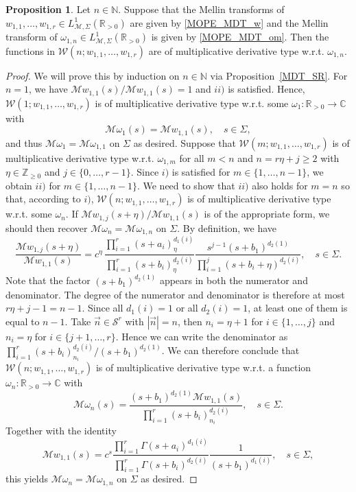 \documentclass[a4paper,12pt,oneside]{article}
\theoremstyle{definition}
\newtheorem{prop}[defi]{Proposition}
\newcommand{\N}{\mathbb{N}}
\newcommand{\Z}{\mathbb{Z}}
\newcommand{\C}{\mathbb{C}}
\newcommand{\R}{\mathbb{R}}
\newcommand{\om}{\omega}
\newcommand{\sz}[1]{\left| \vec{#1} \right|}
\newcommand{\MT}[1]{\mathcal{M}#1}
\begin{document}
\begin{prop}
Let $n\in\N$. Suppose that the Mellin transforms of $w_{1,1},\dots,w_{1,r}\in L^{1}_{\MT{},\Sigma}(\R_{>0})$ are given by \eqref{MOPE_MDT_w} and the Mellin transform of $\om_{1,n}\in L^{1}_{\MT{},\Sigma}(\R_{>0})$ is given by \eqref{MOPE_MDT_om}. Then the functions in $\mathcal{W}(n;w_{1,1},\dots,w_{1,r})$ are of multiplicative derivative type w.r.t. $\om_{1,n}$.
\end{prop}
\begin{proof}
    We will prove this by induction on $n\in\N$ via Proposition~\ref{MDT_SR}. For $n=1$, we have $\MT{w_{1,1}}(s)/\MT{w_{1,1}}(s)=1$ and $ii)$ is satisfied. Hence, $\mathcal{W}(1;w_{1,1},\dots,w_{1,r})$ is of multiplicative derivative type w.r.t. some $\om_1:\R_{>0}\to\C$ with
        $$ \MT{\om_1}(s)=\MT{w_{1,1}}(s),\quad s\in\Sigma, $$
    and thus $\MT{\om_1}=\MT{\om_{1,1}}$ on $\Sigma$ as desired. Suppose that $\mathcal{W}(m;w_{1,1},\dots,w_{1,r})$ is of multiplicative derivative type w.r.t. $\om_{1,m}$ for all $m<n$ and $n=r\eta+j\geq 2$ with $\eta\in\Z_{\geq 0}$ and $j\in\{0,\dots,r-1\}$. Since $i)$ is satisfied for $m\in\{1,\dots,n-1\}$, we obtain $ii)$ for $m\in\{1,\dots,n-1\}$. We need to show that $ii)$ also holds for $m=n$ so that, according to $i)$, $\mathcal{W}(n;w_{1,1},\dots,w_{1,r})$ is of multiplicative derivative type w.r.t. some $\om_n$. If $\MT{w_{1,j}}(s+\eta)/\MT{w_{1,1}}(s)$ is of the appropriate form, we should then recover $\MT{\om_n}=\MT{\om_{1,n}}$ on $\Sigma$. By definition, we have
        $$ \frac{\MT{w_{1,j}}(s+\eta)}{\MT{w_{1,1}}(s)} = c^\eta \, \frac{\prod_{i=1}^{r} (s+a_i)_\eta^{d_1(i)}}{\prod_{i=1}^{r} (s+b_i)_\eta^{d_2(i)}} \frac{s^{j-1}(s+b_1)^{d_2(1)}}{\prod_{i=1}^j (s+b_i+\eta)^{d_2(i)}},\quad s\in\Sigma. $$
    Note that the factor $(s+b_1)^{d_2(1)}$ appears in both the numerator and denominator. The degree of the numerator and denominator is therefore at most $r\eta+j-1=n-1$. Since all $d_1(i)=1$ or all $d_2(i)=1$, at least one of them is equal to $n-1$. Take $\vec{n}\in\mathcal{S}^r$ with $\sz{n}=n$, then $n_i = \eta+1$ for $i\in\{1,\dots,j\}$ and $n_i = \eta$ for $i\in\{j+1,\dots,r\}$. Hence we can write the denominator as $\prod_{i=1}^r (s+b_i)_{n_i}^{d_2(i)}/(s+b_1)^{d_2(1)}$. We can therefore conclude that $\mathcal{W}(n;w_{1,1},\dots,w_{1,r})$ is of multiplicative derivative type w.r.t. a function $\om_n:\R_{>0}\to\C$ with    
        $$ \MT{\om_n}(s) = \frac{(s+b_1)^{d_2(1)}\MT{w_{1,1}}(s)}{\prod_{i=1}^r (s+b_i)_{n_i}^{d_2(i)}},\quad s\in\Sigma. $$
    Together with the identity
    $$\MT{w_{1,1}}(s) = c^s \frac{\prod_{i=1}^{r} \Gamma(s+a_i)^{d_1(i)}}{\prod_{i=1}^{r} \Gamma(s+b_i)^{d_2(i)}} \frac{1}{(s+b_1)^{d_1(i)}},\quad s\in\Sigma,$$
    this yields $\MT{\om_n}=\MT{\om_{1,n}}$ on $\Sigma$ as desired.
\end{proof}
\end{document}
